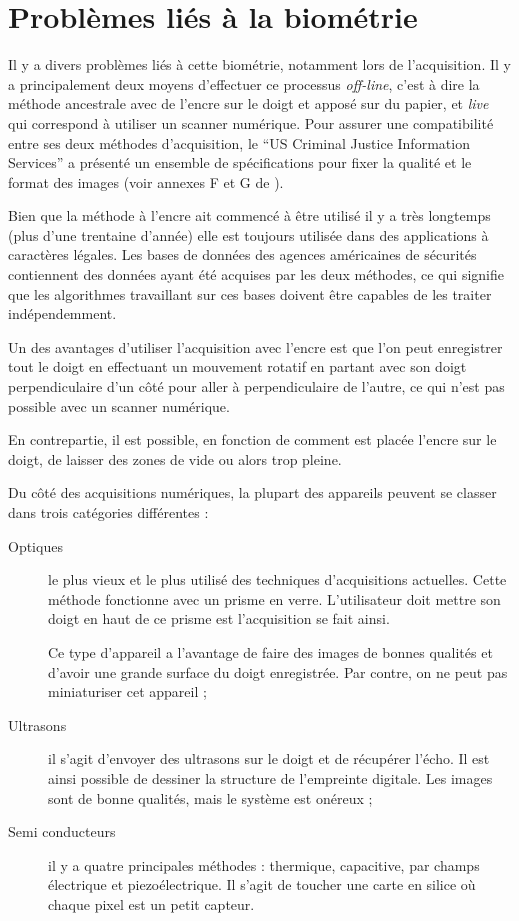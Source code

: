 \section{Problèmes liés à la biométrie}

Il y a divers problèmes liés à cette biométrie, notamment lors de
l'acquisition. Il y a principalement deux moyens d'effectuer ce
processus \emph{off-line}, c'est à dire la méthode ancestrale avec de
l'encre sur le doigt et apposé sur du papier, et \emph{live} qui
correspond à utiliser un scanner numérique. Pour assurer une
compatibilité entre ses deux méthodes d'acquisition, le ``US Criminal
Justice Information Services'' a présenté un ensemble de
spécifications pour fixer la qualité et le format des images (voir
annexes F et G de \cite{nla.cat-vn4185009}).

Bien que la méthode à l'encre ait commencé à être utilisé il y a très
longtemps (plus d'une trentaine d'année) elle est toujours utilisée
dans des applications à caractères légales. Les bases de données des
agences américaines de sécurités contiennent des données ayant été
acquises par les deux méthodes, ce qui signifie que les algorithmes
travaillant sur ces bases doivent être capables de les traiter
indépendemment.

Un des avantages d'utiliser l'acquisition avec l'encre est que l'on
peut enregistrer tout le doigt en effectuant un mouvement rotatif en
partant avec son doigt perpendiculaire d'un côté pour aller à
perpendiculaire de l'autre, ce qui n'est pas possible avec un scanner
numérique.

En contrepartie, il est possible, en fonction de comment est placée
l'encre sur le doigt, de laisser des zones de vide ou alors trop
pleine.

Du côté des acquisitions numériques, la plupart des appareils peuvent
se classer dans trois catégories différentes :

\begin{description}
\item[Optiques] le plus vieux et le plus utilisé des techniques
  d'acquisitions actuelles. Cette méthode fonctionne avec un prisme en
  verre. L'utilisateur doit mettre son doigt en haut de ce prisme est
  l'acquisition se fait ainsi.

  Ce type d'appareil a l'avantage de faire des images de bonnes
  qualités et d'avoir une grande surface du doigt enregistrée. Par
  contre, on ne peut pas miniaturiser cet appareil ;
\item[Ultrasons] il s'agit d'envoyer des ultrasons sur le doigt et de
  récupérer l'écho. Il est ainsi possible de dessiner la structure de
  l'empreinte digitale. Les images sont de bonne qualités, mais le
  système est onéreux ;
\item[Semi conducteurs] il y a quatre principales méthodes :
  thermique, capacitive, par champs électrique et piezoélectrique.  Il
  s'agit de toucher une carte en silice où chaque pixel est un petit
  capteur.
\end{description}


